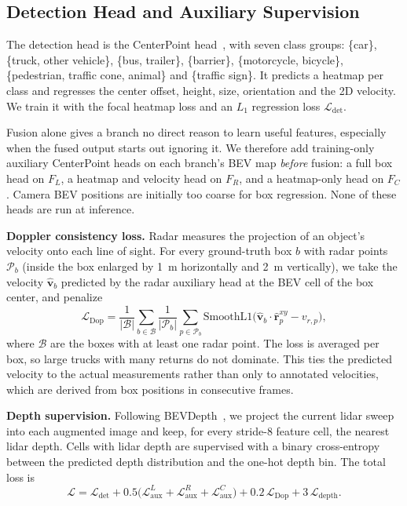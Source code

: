 \documentclass[conference]{IEEEtran}
\newcommand{\vect}[1]{\mathbf{#1}}
\begin{document}
\subsection{Detection Head and Auxiliary Supervision}

The detection head is the CenterPoint head~\cite{yin2021centerpoint}, with seven class groups: \{car\},
\{truck, other vehicle\}, \{bus, trailer\}, \{barrier\}, \{motorcycle, bicycle\}, \{pedestrian, traffic cone,
animal\} and \{traffic sign\}. It predicts a heatmap per class and regresses the center offset, height, size,
orientation and the 2D velocity. We train it with the focal heatmap loss and an $L_1$ regression loss
$\mathcal{L}_{\mathrm{det}}$.

Fusion alone gives a branch no direct reason to learn useful features, especially when the fused output starts out
ignoring it. We therefore add training-only auxiliary CenterPoint heads on each branch's BEV map \emph{before} fusion:
a full box head on $F_L$, a heatmap and velocity head on $F_R$, and a heatmap-only head on $F_C$. Camera BEV positions
are initially too coarse for box regression. None of these heads are run at inference.

\textbf{Doppler consistency loss.} Radar measures the projection of an object's velocity onto each line of sight. For
every ground-truth box $b$ with radar points $\mathcal{P}_b$ (inside the box enlarged by 1~m horizontally and 2~m
vertically), we take the velocity $\hat{\vect{v}}_b$ predicted by the radar auxiliary head at the BEV cell of the box
center, and penalize
\begin{equation}
\mathcal{L}_{\mathrm{Dop}} = \frac{1}{|\mathcal{B}|} \sum_{b \in \mathcal{B}} \frac{1}{|\mathcal{P}_b|}
\sum_{p \in \mathcal{P}_b} \mathrm{SmoothL1}\big(\hat{\vect{v}}_b \cdot \hat{\vect{r}}^{xy}_p - v_{r,p}\big),
\end{equation}
where $\mathcal{B}$ are the boxes with at least one radar point. The loss is averaged per box, so large trucks with
many returns do not dominate. This ties the predicted velocity to the actual measurements rather than only to
annotated velocities, which are derived from box positions in consecutive frames.

\textbf{Depth supervision.} Following BEVDepth~\cite{li2023bevdepth}, we project the current lidar sweep into each
augmented image and keep, for every stride-8 feature cell, the nearest lidar depth. Cells with lidar depth are
supervised with a binary cross-entropy between the predicted depth distribution and the one-hot depth bin. The total
loss is
\begin{equation}
\mathcal{L} = \mathcal{L}_{\mathrm{det}} + 0.5\big(\mathcal{L}^{L}_{\mathrm{aux}} + \mathcal{L}^{R}_{\mathrm{aux}}
 + \mathcal{L}^{C}_{\mathrm{aux}}\big) + 0.2\,\mathcal{L}_{\mathrm{Dop}} + 3\,\mathcal{L}_{\mathrm{depth}}.
\end{equation}
\end{document}
